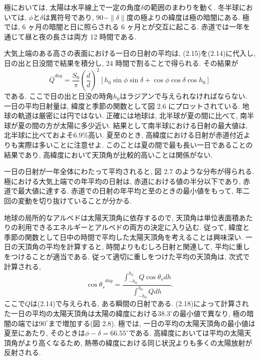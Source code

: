 \documentclass[a4j,12pt,openbib,oneside,dvipdfmx]{jbook}
\begin{document}
極においては, 太陽は水平線上で一定の角度$\delta$の範囲のまわりを動く.
冬半球においては, $\phi$と$\delta$は異符号であり, $90-\|\delta\|$度の極よりの緯度は極の暗闇にある.
極では, 6 ヶ月の暗闇と日に照らされる 6 ヶ月とが交互に起こる. 赤道では一年を通じて昼と夜の長さは両方 12 時間である.
\par
大気上端のある高さの表面における一日の日射の平均は, (2.15)を(2.14)に代入し, 日の出と日没間で結果を積分し, 24 時間で割ることで得られる. 
その結果が
\begin{equation}
  \overline{Q}^{day}=\frac{S_0}{\pi}\left(\frac{\overline{d}}{d}\right)^2\left[h_0\sin\phi\sin\delta+\cos\phi\cos\delta\cos{h_0}\right]
\end{equation}
である. ここで日の出と日没の時角$h_0$はラジアンで与えられなければならない. 一日の平均日射量は, 緯度と季節の関数として図 2.6 にプロットされている.
地球の軌道は厳密には円ではない. 正確には地球は, 北半球が夏の間に比べて, 南半球が夏の間の方が太陽に多少近い. 
結果として南半球における日射の最大値は, 北半球に比べておよそ$6.9\%$高い.
夏至のとき, 高緯度における日射が赤道付近よりも実際は多いことに注意せよ.
このことは夏の間で最も長い一日であることの結果であり, 高緯度において天頂角が比較的高いことは関係がない.
\par
一日の日射が一年全体にわたって平均されると, 図 2.7 のような分布が得られる.
極における大気上端での年平均の日射は, 赤道における値の半分以下であり, 赤道で最大値に達する. 赤道での日射の年平均と至のときの最小値をもって, 年二回の変動を切り抜けていることが分かる.
\par
地球の局所的なアルベドは太陽天頂角に依存するので, 天頂角は単位表面積あたりの利用できるエネルギーとアルベドの両方の決定に入り込む. 
従って, 緯度と季節の関数として日中の時間で平均した太陽天頂角を考えることは興味深い.
一日の天頂角の平均を計算すると, 時間よりもむしろ日射と関連して, 平均に重しをつけることが適当である. 
従って適切に重しをつけた平均の天頂角は, 次式で計算される,
\begin{equation}
  \overline{\cos{\theta_s}}^{day}=\frac{\int_{-h_0}^{h_0} Q\cos{\theta_s}dh}{\int_{-h_0}^{h_0} Qdh }.
\end{equation}
ここで$Q$は(2.14)で与えられる, ある瞬間の日射である.
(2.18)によって計算された一日の平均の太陽天頂角は太陽の緯度における$38.3^\circ$の最小値で異なり, 極の暗闇の端では$90^\circ$まで増加する(図 2.8).
極では, 一日の平均の太陽天頂角の最小値は夏至にあたり, そのときは$\phi-\delta=66.55^\circ$である.
高緯度においては平均の太陽天頂角がより高くなるため, 熱帯の緯度における同じ状況よりも多くの太陽放射が反射される.
\end{document}
